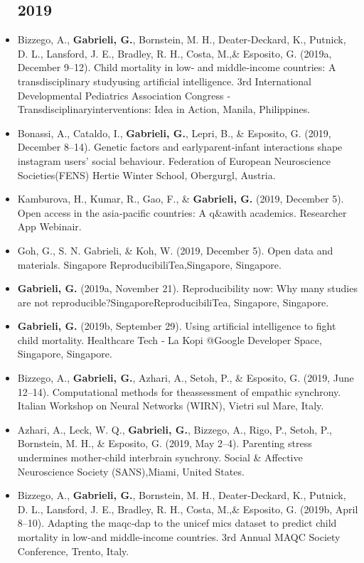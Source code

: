 \documentclass[10pt,a4paper]{altacv}
\begin{document}
\begin{fullwidth}
\begin{itemize}
\subsection*{2019}
 \item Bizzego, A., \textbf{Gabrieli, G.}, Bornstein, M. H., Deater‐Deckard, K., Putnick, D. L., Lansford, J. E., Bradley, R. H., Costa, M.,\& Esposito, G. (2019a, December 9–12). Child mortality in low‐ and middle‐income countries: A transdisciplinary studyusing artificial intelligence. 3rd International Developmental Pediatrics Association Congress ‐ Transdisciplinaryinterventions: Idea in Action, Manila, Philippines.
 \item Bonassi, A., Cataldo, I., \textbf{Gabrieli, G.}, Lepri, B., \& Esposito, G. (2019, December 8–14). Genetic factors and earlyparent‐infant interactions shape instagram users’ social behaviour. Federation of European Neuroscience Societies(FENS) Hertie Winter School, Obergurgl, Austria.
 \item Kamburova, H., Kumar, R., Gao, F., \& \textbf{Gabrieli, G.} (2019, December 5). Open access in the asia‐pacific countries: A q\&awith academics. Researcher App Webinair.
 \item Goh, G., S. N. Gabrieli, \& Koh, W. (2019, December 5). Open data and materials. Singapore ReproducibiliTea,Singapore, Singapore.
 \item  \textbf{Gabrieli, G.} (2019a, November 21). Reproducibility now: Why many studies are not reproducible?SingaporeReproducibiliTea, Singapore, Singapore.
 \item  \textbf{Gabrieli, G.} (2019b, September 29). Using artificial intelligence to fight child mortality. Healthcare Tech ‐ La Kopi @Google Developer Space, Singapore, Singapore.
 \item Bizzego, A., \textbf{Gabrieli, G.}, Azhari, A., Setoh, P., \& Esposito, G. (2019, June 12–14). Computational methods for theassessment of empathic synchrony. Italian Workshop on Neural Networks (WIRN), Vietri sul Mare, Italy.
 \item Azhari, A., Leck, W. Q., \textbf{Gabrieli, G.}, Bizzego, A., Rigo, P., Setoh, P., Bornstein, M. H., \& Esposito, G. (2019, May 2–4). Parenting stress undermines mother‐child interbrain synchrony. Social \& Affective Neuroscience Society (SANS),Miami, United States.
 \item Bizzego, A., \textbf{Gabrieli, G.}, Bornstein, M. H., Deater‐Deckard, K., Putnick, D. L., Lansford, J. E., Bradley, R. H., Costa, M.,\& Esposito, G. (2019b, April 8–10). Adapting the maqc‐dap to the unicef mics dataset to predict child mortality in low‐and middle‐income countries. 3rd Annual MAQC Society Conference, Trento, Italy.

\end{itemize}
\end{fullwidth}
\end{document}
